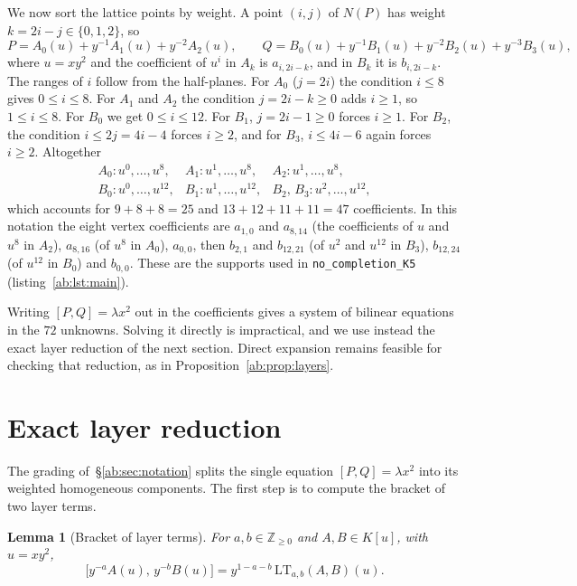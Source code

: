 \documentclass[a4paper,11pt]{article}
\theoremstyle{jsplain}
\newtheorem{lemma}[theorem]{Lemma}
\theoremstyle{jsdef}
\theoremstyle{jsrem}
\begin{document}
We now sort the lattice points by weight. A point $(i,j)$ of $N(P)$ has weight $k=2i-j\in\{0,1,2\}$, so
\begin{equation}\label{ab:eq:decomp}
P=A_0(u)+y^{-1}A_1(u)+y^{-2}A_2(u),\qquad Q=B_0(u)+y^{-1}B_1(u)+y^{-2}B_2(u)+y^{-3}B_3(u),
\end{equation}
where $u=xy^2$ and the coefficient of $u^i$ in $A_k$ is $a_{i,2i-k}$, and in $B_k$ it is $b_{i,2i-k}$. The ranges of $i$ follow from the half-planes. For $A_0$ ($j=2i$) the condition $i\le8$ gives $0\le i\le 8$. For $A_1$ and $A_2$ the condition $j=2i-k\ge0$ adds $i\ge1$, so $1\le i\le8$. For $B_0$ we get $0\le i\le12$. For $B_1$, $j=2i-1\ge0$ forces $i\ge1$. For $B_2$, the condition $i\le 2j=4i-4$ forces $i\ge 2$, and for $B_3$, $i\le 4i-6$ again forces $i\ge2$. Altogether
\[
\begin{array}{lll}
A_0\colon u^0,\dots,u^8, & A_1\colon u^1,\dots,u^8, & A_2\colon u^1,\dots,u^8,\\
B_0\colon u^0,\dots,u^{12}, & B_1\colon u^1,\dots,u^{12}, & B_2,\,B_3\colon u^2,\dots,u^{12},
\end{array}
\]
which accounts for $9+8+8=25$ and $13+12+11+11=47$ coefficients. In this notation the eight vertex coefficients are $a_{1,0}$ and $a_{8,14}$ (the coefficients of $u$ and $u^8$ in $A_2$), $a_{8,16}$ (of $u^8$ in $A_0$), $a_{0,0}$, then $b_{2,1}$ and $b_{12,21}$ (of $u^2$ and $u^{12}$ in $B_3$), $b_{12,24}$ (of $u^{12}$ in $B_0$) and $b_{0,0}$. These are the supports used in \texttt{no\_\allowbreak{}completion\_\allowbreak{}K5} (listing~\ref{ab:lst:main}).

Writing $[P,Q]=\lambda x^2$ out in the coefficients gives a system of bilinear equations in the $72$ unknowns. Solving it directly is impractical, and we use instead the exact layer reduction of the next section. Direct expansion remains feasible for checking that reduction, as in Proposition~\ref{ab:prop:layers}.

\section{Exact layer reduction}\label{ab:sec:layers}

The grading of~\S\ref{ab:sec:notation} splits the single equation $[P,Q]=\lambda x^2$ into its weighted homogeneous components. The first step is to compute the bracket of two layer terms.

\begin{lemma}[Bracket of layer terms]\label{ab:lem:layerbracket}
For $a,b\in\mathbb{Z}_{\ge0}$ and $A,B\in K[u]$, with $u=xy^2$,
\[
\bigl[y^{-a}A(u),\,y^{-b}B(u)\bigr]=y^{1-a-b}\,\mathrm{LT}_{a,b}(A,B)(u).
\]
\end{lemma}
\end{document}
